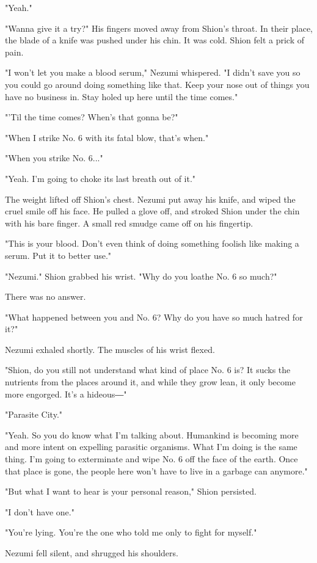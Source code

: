 "Yeah."

"Wanna give it a try?" His fingers moved away from Shion's throat. In
their place, the blade of a knife was pushed under his chin. It was
cold. Shion felt a prick of pain.

"I won't let you make a blood serum," Nezumi whispered. "I didn't save
you so you could go around doing something like that. Keep your nose out
of things you have no business in. Stay holed up here until the time
comes."

"'Til the time comes? When's that gonna be?"

"When I strike No. 6 with its fatal blow, that's when."

"When you strike No. 6..."

"Yeah. I'm going to choke its last breath out of it."

The weight lifted off Shion's chest. Nezumi put away his knife, and
wiped the cruel smile off his face. He pulled a glove off, and stroked
Shion under the chin with his bare finger. A small red smudge came off
on his fingertip.

"This is your blood. Don't even think of doing something foolish like
making a serum. Put it to better use."

"Nezumi." Shion grabbed his wrist. "Why do you loathe No. 6 so much?"

There was no answer.

"What happened between you and No. 6? Why do you have so much hatred for
it?"

Nezumi exhaled shortly. The muscles of his wrist flexed.

"Shion, do you still not understand what kind of place No. 6 is? It
sucks the nutrients from the places around it, and while they grow lean,
it only become more engorged. It's a hideous―"

"Parasite City."

"Yeah. So you do know what I'm talking about. Humankind is becoming more
and more intent on expelling parasitic organisms. What I'm doing is the
same thing. I'm going to exterminate and wipe No. 6 off the face of the
earth. Once that place is gone, the people here won't have to live in a
garbage can anymore."

"But what I want to hear is your personal reason," Shion persisted.

"I don't have one."

"You're lying. You're the one who told me only to fight for myself."

Nezumi fell silent, and shrugged his shoulders.

